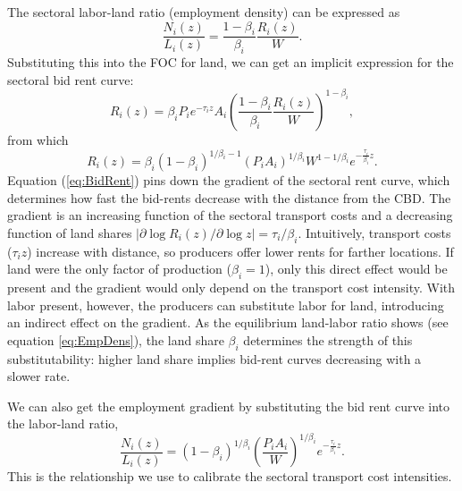 \documentclass[12pt]{article}
\begin{document}
The sectoral labor-land ratio (employment density) can be expressed as
\begin{equation}
\label{eq:EmpDens}
\frac{N_i(z)}{L_i(z)} = \frac{1-\beta_i}{\beta_i}\frac{R_i(z)}{W}.
\end{equation}
Substituting this into the FOC for land, we can get an implicit expression for the sectoral bid rent curve:
\[
R_i(z) =\beta_i P_ie^{-\tau_i z}A_i \left(\frac{1-\beta_i}{\beta_i}\frac{R_i(z)}{W}\right)^{1-\beta_i},
\]
from which
\begin{equation}
\label{eq:BidRent}
R_i(z) =\beta_i(1-\beta_i)^{1/\beta_i-1} (P_iA_i)^{1/\beta_i} W^{1-1/\beta_i} e^{-\frac{\tau_i}{\beta_i} z}.
\end{equation}
Equation (\ref{eq:BidRent}) pins down the gradient of the sectoral rent curve, which determines how fast the bid-rents decrease with the distance from the CBD. The gradient is an increasing function of the sectoral transport costs and a decreasing function of land shares $|\partial\log R_i(z)/\partial \log z|=\tau_i/\beta_i$. Intuitively, transport costs ($\tau_iz$) increase with distance, so producers offer lower rents for farther locations. If land were the only factor of production ($\beta_i=1$), only this direct effect would be present and the gradient would only depend on the transport cost intensity. With labor present, however, the producers can substitute labor for land, introducing an indirect effect on the gradient. As the equilibrium land-labor ratio shows (see equation \ref{eq:EmpDens}), the land share $\beta_i$ determines the strength of this substitutability: higher land share implies bid-rent curves decreasing with a slower rate.

We can also get the employment gradient by substituting the bid rent curve into the labor-land ratio,
\begin{equation}
\label{eq:EmpGrad}
\frac{N_i(z)}{L_i(z)} = (1-\beta_i)^{1/\beta_i} \left(\frac{P_iA_i}{W}\right)^{1/\beta_i} e^{-\frac{\tau_i}{\beta_i} z}.
\end{equation}
This is the relationship we use to calibrate the sectoral transport cost intensities.
\end{document}
